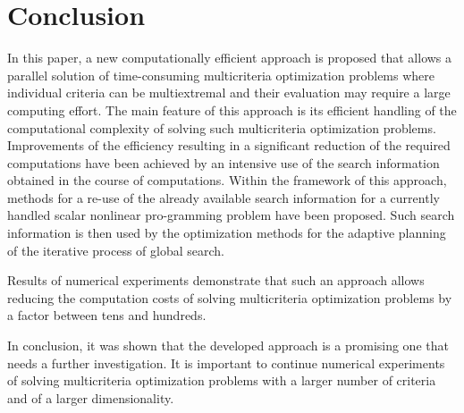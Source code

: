 \section{Conclusion}
\label{sec:5}
In this paper, a new computationally efficient approach is proposed that allows a parallel solution of time-consuming multicriteria optimization problems where individual criteria can be multiextremal and their evaluation may require a large computing effort. The main feature of this approach is its efficient handling of the computational complexity of solving such multicriteria optimization problems. Improvements of the efficiency resulting in a significant reduction of the required computations have been achieved by an intensive use of the search information obtained in the course of computations. Within the framework of this approach, methods for a re-use of the already available search information for a currently handled scalar nonlinear pro-gramming problem have been proposed. Such search information is then used by the optimization methods for the adaptive planning of the iterative process of global search.

Results of numerical experiments demonstrate that such an approach allows reducing the computation costs of solving multicriteria optimization problems by a factor between tens and hundreds. 

In conclusion, it was shown that the developed approach is a promising one that needs a further investigation. It is important to continue numerical experiments of solving multicriteria optimization problems with a larger number of criteria and of a larger dimensionality. 



